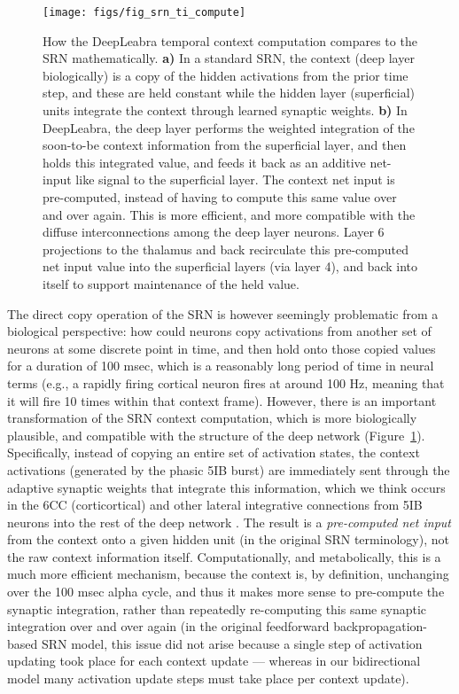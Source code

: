 \documentclass[11pt,twoside]{article}
\newif\myifpdf
\begin{document}
\begin{figure}
  \centering\texttt{[image: figs/fig\_srn\_ti\_compute]}
  \caption{\footnotesize How the DeepLeabra temporal context computation compares to the SRN mathematically. {\bf a)} In a standard SRN, the context (deep layer biologically) is a copy of the hidden activations from the prior time step, and these are held constant while the hidden layer (superficial) units integrate the context through learned synaptic weights.  {\bf b)} In DeepLeabra, the deep layer performs the weighted integration of the soon-to-be context information from the superficial layer, and then holds this integrated value, and feeds it back as an additive net-input like signal to the superficial layer.  The context net input is pre-computed, instead of having to compute this same value over and over again.  This is more efficient, and more compatible with the diffuse interconnections among the deep layer neurons.  Layer 6 projections to the thalamus and back recirculate this pre-computed net input value into the superficial layers (via layer 4), and back into itself to support maintenance of the held value.}
  \label{fig.srn_vs_ti}
\end{figure}

The direct copy operation of the SRN is however seemingly problematic from a biological perspective: how could neurons copy activations from another set of neurons at some discrete point in time, and then hold onto those copied values for a duration of 100 msec, which is a reasonably long period of time in neural terms (e.g., a rapidly firing cortical neuron fires at around 100 Hz, meaning that it will fire 10 times within that context frame).  However, there is an important transformation of the SRN context computation, which is more biologically plausible, and compatible with the structure of the deep network (Figure~\ref{fig.srn_vs_ti}). Specifically, instead of copying an entire set of activation states, the context activations (generated by the phasic 5IB burst) are immediately sent through the adaptive synaptic weights that integrate this information, which we think occurs in the 6CC (corticortical) and other lateral integrative connections from 5IB neurons into the rest of the deep network \cite{Thomson10,ThomsonLamy07,SchubertKotterStaiger07}.  The result is a {\em pre-computed net input} from the context onto a given hidden unit (in the original SRN terminology), not the raw context information itself.  Computationally, and metabolically, this is a much more efficient mechanism, because the context is, by definition, unchanging over the 100 msec alpha cycle, and thus it makes more sense to pre-compute the synaptic integration, rather than repeatedly re-computing this same synaptic integration over and over again (in the original feedforward backpropagation-based SRN model, this issue did not arise because a single step of activation updating took place for each context update --- whereas in our bidirectional model many activation update steps must take place per context update).
\end{document}
